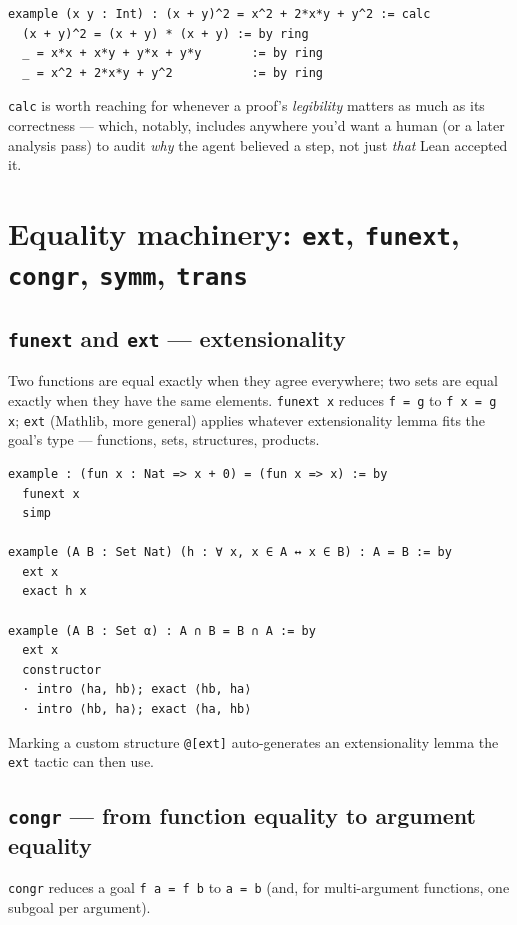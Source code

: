 \begin{verbatim}
example (x y : Int) : (x + y)^2 = x^2 + 2*x*y + y^2 := calc
  (x + y)^2 = (x + y) * (x + y) := by ring
  _ = x*x + x*y + y*x + y*y       := by ring
  _ = x^2 + 2*x*y + y^2           := by ring
\end{verbatim}

\texttt{calc} is worth reaching for whenever a proof's \emph{legibility} matters as much as its correctness --- which, notably, includes anywhere you'd want a human (or a later analysis pass) to audit \emph{why} the agent believed a step, not just \emph{that} Lean accepted it.

\section{Equality machinery: \texttt{ext}, \texttt{funext}, \texttt{congr}, \texttt{symm}, \texttt{trans}}

\subsection{\texttt{funext} and \texttt{ext} --- extensionality}

Two functions are equal exactly when they agree everywhere; two sets are equal exactly when they have the same elements. \texttt{funext x} reduces \texttt{f = g} to \texttt{f x = g x}; \texttt{ext} (Mathlib, more general) applies whatever extensionality lemma fits the goal's type --- functions, sets, structures, products.

\begin{verbatim}
example : (fun x : Nat => x + 0) = (fun x => x) := by
  funext x
  simp

example (A B : Set Nat) (h : ∀ x, x ∈ A ↔ x ∈ B) : A = B := by
  ext x
  exact h x

example (A B : Set α) : A ∩ B = B ∩ A := by
  ext x
  constructor
  · intro ⟨ha, hb⟩; exact ⟨hb, ha⟩
  · intro ⟨hb, ha⟩; exact ⟨ha, hb⟩
\end{verbatim}

Marking a custom structure \texttt{@[ext]} auto-generates an extensionality lemma the \texttt{ext} tactic can then use.

\subsection{\texttt{congr} --- from function equality to argument equality}

\texttt{congr} reduces a goal \texttt{f a = f b} to \texttt{a = b} (and, for multi-argument functions, one subgoal per argument).


